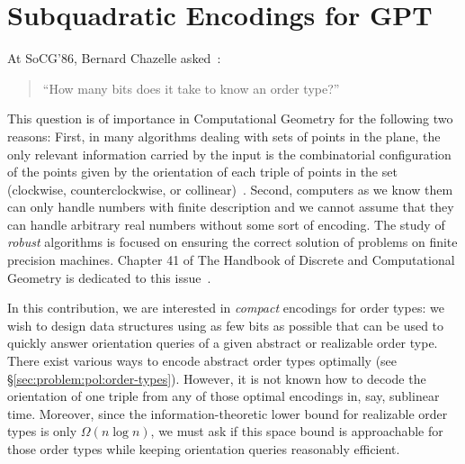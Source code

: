 \section{Subquadratic Encodings for GPT}
At SoCG'86, Bernard Chazelle asked~\cite{GP93}:
\begin{quotation}
``How many bits does it take to know an order type?''
\end{quotation}

This question is of importance in Computational Geometry for the following two
reasons:
%
First, in many algorithms dealing with sets of points in the plane,
the only relevant information carried by the input is the combinatorial
configuration of the points given by the orientation of each triple of points in the
set (clockwise, counterclockwise, or collinear)~\cite{Knu92,Ed12,Epp18}.
%
Second, computers as we know them can only handle numbers with
finite description and we cannot assume that they can handle arbitrary
real numbers without some sort of encoding. The study of \emph{robust}
algorithms is focused on ensuring the correct solution of problems on finite
precision machines. Chapter 41 of The Handbook of Discrete and Computational
Geometry is dedicated to this issue~\cite{Ya04}.

In this contribution, we are interested in \emph{compact} encodings for
order types: we wish to design data structures using as few bits as possible
that can be used to quickly answer orientation queries of a given abstract or
realizable order type.
%
There exist various ways to encode abstract order types optimally (see
\S\ref{sec:problem:pol:order-types}).
%
However, it is not known how to decode the orientation of one triple from any
of those optimal encodings in, say, sublinear time.
%
Moreover, since the information-theoretic lower bound for realizable order
types is only \(\Omega(n \log{n})\), we must ask if this space bound is
approachable for those order types while keeping orientation queries reasonably
efficient.

